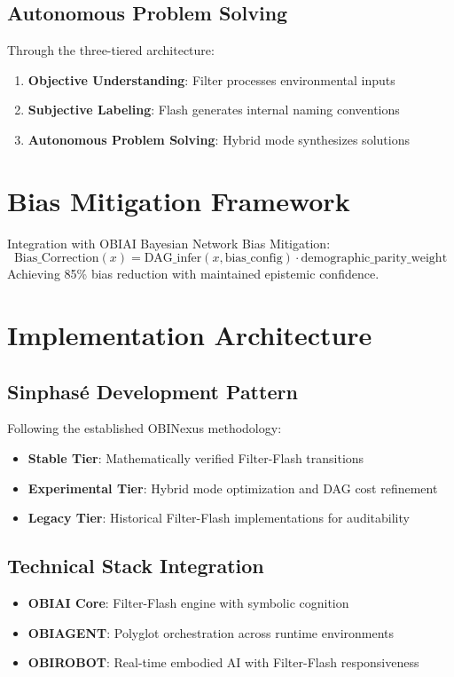 \documentclass[11pt]{article}
\begin{document}
\subsection{Autonomous Problem Solving}
Through the three-tiered architecture:
\begin{enumerate}
\item \textbf{Objective Understanding}: Filter processes environmental inputs
\item \textbf{Subjective Labeling}: Flash generates internal naming conventions
\item \textbf{Autonomous Problem Solving}: Hybrid mode synthesizes solutions
\end{enumerate}

\section{Bias Mitigation Framework}

Integration with OBIAI Bayesian Network Bias Mitigation:
\begin{equation}
\text{Bias\_Correction}(x) = \text{DAG\_infer}(x, \text{bias\_config}) \cdot \text{demographic\_parity\_weight}
\end{equation}
Achieving 85\% bias reduction with maintained epistemic confidence.

\section{Implementation Architecture}

\subsection{Sinphasé Development Pattern}
Following the established OBINexus methodology:
\begin{itemize}
\item \textbf{Stable Tier}: Mathematically verified Filter-Flash transitions
\item \textbf{Experimental Tier}: Hybrid mode optimization and DAG cost refinement
\item \textbf{Legacy Tier}: Historical Filter-Flash implementations for auditability
\end{itemize}

\subsection{Technical Stack Integration}
\begin{itemize}
\item \textbf{OBIAI Core}: Filter-Flash engine with symbolic cognition
\item \textbf{OBIAGENT}: Polyglot orchestration across runtime environments
\item \textbf{OBIROBOT}: Real-time embodied AI with Filter-Flash responsiveness
\end{itemize}
\end{document}
